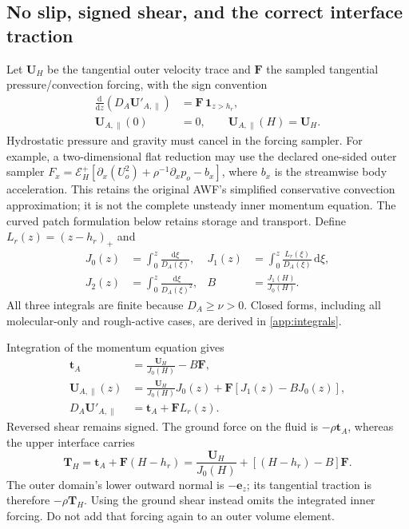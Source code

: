 \documentclass[11pt,a4paper]{article}
\numberwithin{equation}{section}
\newcommand{\dd}{\mathrm d}
\begin{document}
\subsection{No slip, signed shear, and the correct interface traction}
\label{awf:momentum}

Let $\boldsymbol U_H$ be the tangential outer velocity trace and
$\boldsymbol F$ the sampled tangential pressure/convection forcing,
with the sign convention
\begin{equation}
 \begin{aligned}
 \frac{\dd}{\dd z}\left(D_A\boldsymbol U'_{A,\parallel}\right)
 &=\boldsymbol F\,\mathbf1_{z>h_r},\\
 \boldsymbol U_{A,\parallel}(0)&=0,\qquad
 \boldsymbol U_{A,\parallel}(H)=\boldsymbol U_H.
 \end{aligned}
 \label{awf:momentum-ode}
\end{equation}
Hydrostatic pressure and gravity must cancel in the forcing sampler.
For example, a two-dimensional flat reduction may use the declared
one-sided outer sampler
$F_x=\mathcal E_H^+[\partial_x(U_o^2)+\rho^{-1}\partial_xp_o-b_x]$,
where $b_x$ is the streamwise body acceleration. This retains the
original AWF's simplified conservative convection approximation;
it is not the complete unsteady inner momentum equation. The
curved patch formulation below retains storage and transport.
Define $L_r(z)=(z-h_r)_+$ and
\begin{equation}
 \begin{aligned}
 J_0(z)&=\int_0^z\frac{\dd\xi}{D_A(\xi)},&
 J_1(z)&=\int_0^z\frac{L_r(\xi)}{D_A(\xi)}\,\dd\xi,\\
 J_2(z)&=\int_0^z\frac{\dd\xi}{D_A(\xi)^2},&
 B&=\frac{J_1(H)}{J_0(H)}.
 \end{aligned}
 \label{awf:integrals}
\end{equation}
All three integrals are finite because $D_A\geq\nu>0$.
Closed forms, including all molecular-only and rough-active cases,
are derived in \cref{app:integrals}.

Integration of the momentum equation gives
\begin{align}
 \boldsymbol t_A&=\frac{\boldsymbol U_H}{J_0(H)}
                  -B\boldsymbol F, \label{awf:wall-shear}\\
 \boldsymbol U_{A,\parallel}(z)
 &=\frac{\boldsymbol U_H}{J_0(H)}J_0(z)
   +\boldsymbol F[J_1(z)-BJ_0(z)], \label{awf:velocity}\\
 D_A\boldsymbol U'_{A,\parallel}
 &=\boldsymbol t_A+\boldsymbol F L_r(z). \label{awf:shear-profile}
\end{align}
Reversed shear remains signed. The ground force on the fluid is
$-\rho\boldsymbol t_A$, whereas the upper interface carries
\begin{equation}
 \boxed{\boldsymbol T_H
 =\boldsymbol t_A+\boldsymbol F(H-h_r)
 =\frac{\boldsymbol U_H}{J_0(H)}
  +[(H-h_r)-B]\boldsymbol F.}
 \label{awf:interface-shear}
\end{equation}
The outer domain's lower outward normal is $-\boldsymbol e_z$;
its tangential traction is therefore $-\rho\boldsymbol T_H$.
Using the ground shear instead omits the integrated inner forcing.
Do not add that forcing again to an outer volume element.
\end{document}
